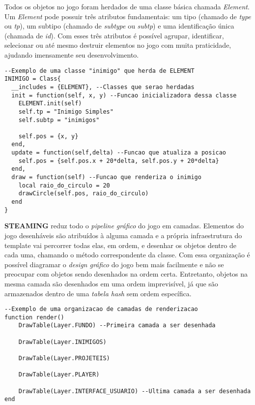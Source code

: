 Todos os objetos no jogo foram herdados de uma classe básica chamada \textit{Element}. Um \textit{Element} pode possuir três atributos fundamentais: um tipo (chamado de \textit{type} ou \textit{tp}), um subtipo (chamado de \textit{subtype} ou \textit{subtp}) e uma identificação única (chamada de \textit{id}). Com esses três atributos é possível agrupar, identificar, selecionar ou até mesmo destruir elementos no jogo com muita praticidade, ajudando imensamente seu desenvolvimento.

\begin{lstlisting}[language={[5.0]lua}]
--Exemplo de uma classe "inimigo" que herda de ELEMENT
INIMIGO = Class{
  __includes = {ELEMENT}, --Classes que serao herdadas
  init = function(self, x, y) --Funcao inicializadora dessa classe
    ELEMENT.init(self)
    self.tp = "Inimigo Simples"
    self.subtp = "inimigos"

    self.pos = {x, y}
  end,
  update = function(self,delta) --Funcao que atualiza a posicao
    self.pos = {self.pos.x + 20*delta, self.pos.y + 20*delta}
  end,
  draw = function(self) --Funcao que renderiza o inimigo
    local raio_do_circulo = 20
    drawCircle(self.pos, raio_do_circulo)
  end
}
\end{lstlisting}

\textbf{STEAMING} reduz todo o \textit{pipeline gráfico} do jogo em camadas. Elementos do jogo desenháveis são atribuídos à alguma camada e a própria infraestrutura do template vai percorrer todas elas, em ordem, e desenhar os objetos dentro de cada uma, chamando o método correspondente da classe. Com essa organização é possível diagramar o \textit{design gráfico} do jogo bem mais facilmente e não se preocupar com objetos sendo desenhados na ordem certa. Entretanto, objetos na mesma camada são desenhados em uma ordem imprevisível, já que são armazenados dentro de uma \textit{tabela hash} sem ordem específica.

\begin{lstlisting}[language={[5.0]lua}]
--Exemplo de uma organizacao de camadas de renderizacao
function render()
    DrawTable(Layer.FUNDO) --Primeira camada a ser desenhada

    DrawTable(Layer.INIMIGOS)

    DrawTable(Layer.PROJETEIS)

    DrawTable(Layer.PLAYER)

    DrawTable(Layer.INTERFACE_USUARIO) --Ultima camada a ser desenhada
end
\end{lstlisting}

